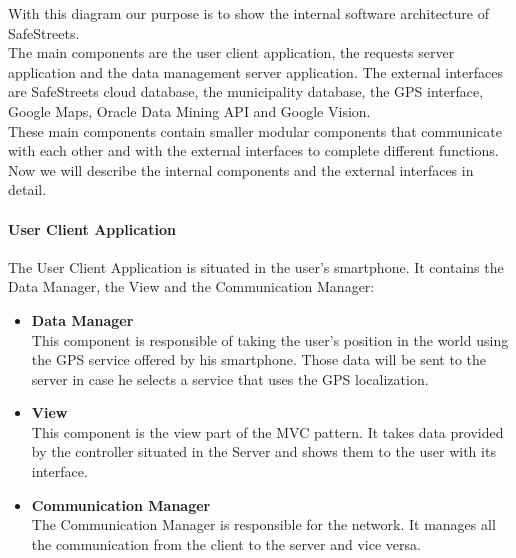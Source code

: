 \documentclass[titlepage]{article}
\begin{document}
With this diagram our purpose is to show the internal software architecture of SafeStreets. \\
The main components are the user client application, the requests server application and the data management server application. The external interfaces are SafeStreets cloud database, the municipality database, the GPS interface, Google Maps, Oracle Data Mining API and Google Vision.\\
These main components contain smaller modular components that communicate with each other and with the external interfaces to complete different functions.\\
Now we will describe the internal components and the external interfaces in detail. \\

\paragraph{\textbf{User Client Application}}
The User Client Application is situated in the user's smartphone. It contains the Data Manager, the View and the Communication Manager:
\begin{itemize}
\item \textbf{Data Manager}\\
This component is responsible of taking the user's position in the world using the GPS service offered by his smartphone. Those data will be sent to the server in case he selects a service that uses the GPS localization. \\
\item \textbf{View}\\
This component is the view part of the MVC pattern. It takes data provided by the controller situated in the Server and shows them to the user with its interface.
\item \textbf{Communication Manager}\\
The Communication Manager is responsible for the network.
It manages all the communication from the client to the server and vice versa.\\
\end{itemize}
\end{document}
